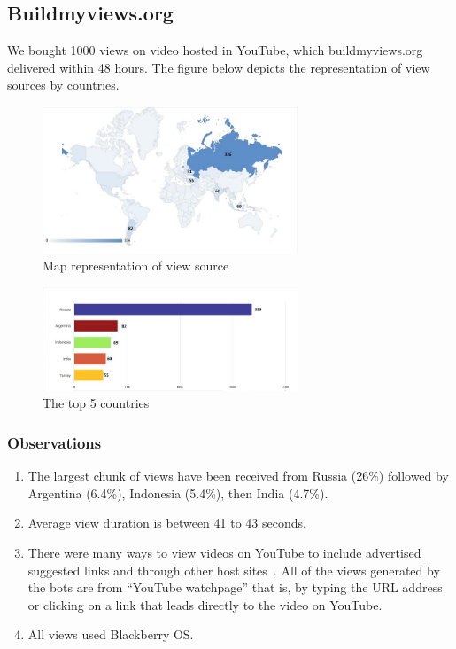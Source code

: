 \documentclass[conference]{IEEEtran}
\begin{document}
\subsection{Buildmyviews.org}
We bought 1000 views on video hosted in YouTube, which buildmyviews.org delivered within 48 hours. The figure below depicts the representation of view sources by countries.

\begin{figure}[h]
  \centering
  \includegraphics[width=3.0in]{fig5a}
  \caption{Map representation of view source}
\end{figure}

\begin{figure}[h]
  \centering
  \includegraphics[width=3.0in]{fig5b}
  \caption{The top 5 countries}
\end{figure}

\subsubsection*{Observations}

\begin{enumerate}
  \item The largest chunk of views have been received from Russia (26\%) followed by Argentina (6.4\%), Indonesia (5.4\%), then India (4.7\%).
  \item Average view duration is between 41 to 43 seconds.
  \item There were many ways to view videos on YouTube to include advertised suggested links and through other host sites~\cite{c20}. All of the views generated by the bots are from ``YouTube watchpage'' that is, by typing the URL address or clicking on a link that leads directly to the video on YouTube.
  \item All views used Blackberry OS.
\end{enumerate}
\end{document}
